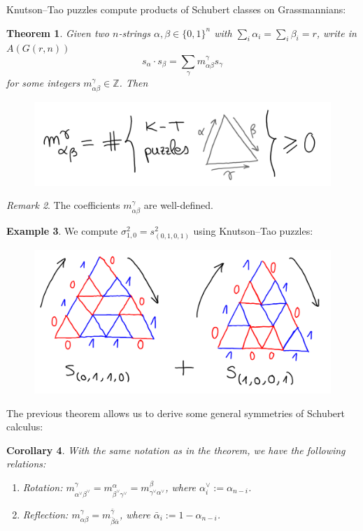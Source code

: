 \documentclass[12pt,a4paper]{amsart}
\theoremstyle{plain}
\newtheorem{thm}{Theorem}
\newtheorem{cor}[thm]{Corollary}
\theoremstyle{definition}
\newtheorem{exmp}[thm]{Example}
\theoremstyle{remark}
\newtheorem{rem}[thm]{Remark}
\begin{document}
Knutson--Tao puzzles compute products of Schubert classes on Grassmannians:

\begin{thm}
  Given two $n$-strings $\alpha,\beta \in \{0, 1\}^{n}$ with $\sum_{i} \alpha_{i} = \sum_{i} \beta_{i} = r$, write in $A(G(r,n))$
  \[ s_{\alpha}\cdot s_{\beta} = \sum_{\gamma} m_{\alpha\beta}^{\gamma} s_{\gamma} \]
  for some integers $m_{\alpha\beta}^{\gamma} \in \mathbb{Z}$.
  Then
  \begin{figure}[H]
    \centering
    \includegraphics[scale=.7]{pictures/knutsontaocoefficients}
  \end{figure}
\end{thm}

\begin{rem}
  The coefficients $m_{\alpha\beta}^{\gamma}$ are well-defined.
\end{rem}

\begin{exmp}
  We compute $\sigma_{1,0}^{2} = s_{(0,1,0,1)}^{2}$ using Knutson--Tao puzzles:
  \begin{figure}[H]
    \centering
    \includegraphics[scale=.7]{pictures/knutsontaosum}
  \end{figure}
\end{exmp}

The previous theorem allows us to derive some general symmetries of Schubert calculus:

\begin{cor}
  With the same notation as in the theorem, we have the following relations:
  \begin{enumerate}[label=(\roman*)]
    \item Rotation: $m_{\alpha^{\vee}\beta^{\vee}}^{\gamma} = m_{\beta^{\vee}\gamma^{\vee}}^{\alpha} = m_{\gamma^{\vee}\alpha^{\vee}}^{\beta}$, where $\alpha_{i}^{\vee} := \alpha_{n - i}$.
    \item Reflection: $m_{\alpha\beta}^{\gamma} = m_{\bar{\beta}\bar{\alpha}}^{\bar{\gamma}}$, where $\bar{\alpha}_{i} := 1 - \alpha_{n - i}$.
  \end{enumerate}
\end{cor}



\vfill
\end{document}

